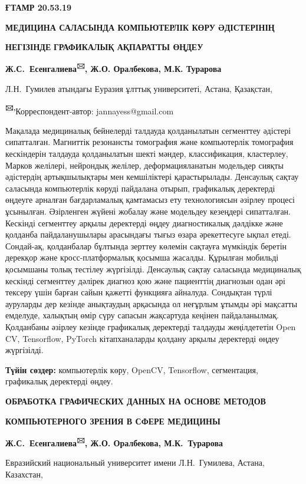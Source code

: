 
\newpage
{\bfseries ҒТАМР 20.53.19}

{\bfseries МЕДИЦИНА САЛАСЫНДА КОМПЬЮТЕРЛІК КӨРУ ӘДІСТЕРІНІҢ}

{\bfseries НЕГІЗІНДЕ} {\bfseries ГРАФИКАЛЫҚ АҚПАРАТТЫ ӨҢДЕУ}

{\bfseries Ж.С.~Есенгалиева\textsuperscript{🖂}, Ж.О. Оралбекова, М.К.
Турарова}

Л.Н.~Гумилев атындағы Еуразия ұлттық университеті, Астана, Қазақстан,

{\bfseries \textsuperscript{🖂,}}Корреспондент-автор: jannayess@gmail.com

Мақалада медициналық бейнелерді талдауда қолданылатын сегменттеу
әдістері сипатталған. Магниттік резонансты томография және компьютерлік
томография кескіндерін талдауда қолданылатын шекті мәндер,
классификация, кластерлеу, Марков желілері, нейрондық желілер,
деформацияланатын модельдер сияқты әдістердің артықшылықтары мен
кемшіліктері қарастырылады. Денсаулық сақтау саласында компьютерлік
көруді пайдалана отырып, графикалық деректерді өңдеуге арналған
бағдарламалық қамтамасыз ету технологиясын әзірлеу процесі ұсынылған.
Әзірленген жүйені жобалау және модельдеу кезеңдері сипатталған. Кескінді
сегменттеу арқылы деректерді өңдеу диагностикалық дәлдікке және қолданба
пайдаланушылары арасындағы тығыз өзара әрекеттесуге ықпал етеді.
Сондай-ақ, қолданбалар бұлтында зерттеу көлемін сақтауға мүмкіндік
беретін дерекқор және кросс-платформалық қосымша жасалды. Құрылған
мобильді қосымшаны толық тестілеу жүргізілді. Денсаулық сақтау саласында
медициналық кескінді сегменттеу дәлірек диагноз қою және пациенттің
диагнозын одан әрі тексеру үшін барған сайын қажетті функцияға айналуда.
Сондықтан түрлі ауруларды дер кезінде анықтаудың арқасында ол неғұрлым
ұтымды әрі мақсатты емделуде, халықтың өмір сүру сапасын жақсартуда
кеңінен пайдаланылмақ. Қолданбаны әзірлеу кезінде графикалық деректерді
талдауды жеңілдететін Open CV, Tensorflow, PyTorch кітапханаларды
қолдану арқылы деректерді өңдеу жүргізілді.

{\bfseries Түйін сөздер:} компьютерлік көру, OpenCV, Tensorflow,
сегментация, графикалық деректерді өңдеу.

{\bfseries ОБРАБОТКА ГРАФИЧЕСКИХ ДАННЫХ НА ОСНОВЕ МЕТОДОВ}

{\bfseries КОМПЬЮТЕРНОГО ЗРЕНИЯ В СФЕРЕ МЕДИЦИНЫ}

{\bfseries Ж.С.~Есенгалиева\textsuperscript{🖂}, Ж.О. Оралбекова,
М.К.~Турарова}

Евразийский национальный университет имени Л.Н.~Гумилева, Астана,
Казахстан,

